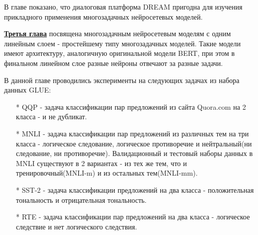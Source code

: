 В главе показано, что диалоговая платформа DREAM пригодна для изучения прикладного применения многозадачных нейросетевых моделей.

\underline{\textbf{Третья глава}} посвящена многозадачным нейросетевым моделям с одним линейным слоем - простейшему типу многозадачных моделей. Такие модели имеют архитектуру, аналогичную оригинальной модели BERT, при этом в финальном линейном слое разные нейроны отвечают за разные задачи.

В данной главе проводились эксперименты на следующих задачах из набора данных GLUE:
\begin{enumerate}
    \item[*] QQP - задача классификации пар предложений из сайта Quora.com на 2 класса - и не дубликат.
    \item[*] MNLI - задача классификации пар предложений из различных тем на три класса - логическое следование, логическое противоречие и нейтральный(ни следование, ни противоречие). Валидационный и тестовый наборы данных в MNLI существуют в 2 вариантах - из тех же тем, что и тренировочный(MNLI-m) и из остальных тем(MNLI-mm).
    \item[*] SST-2 - задача классификации предложений на два класса - положительная тональность и отрицательная тональность.
    \item[*] RTE - задача классификации пар предложений на два класса - логическое следствие и нет логического следствия.
\end{enumerate}

